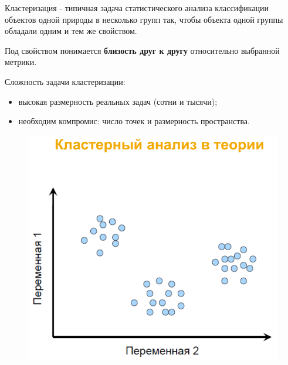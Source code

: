 \documentclass{beamer}
\begin{document}
\begin{frame}
	\begin{block}{Кластеризация - типичная задача статистического анализа}
		классификации объектов одной природы в несколько групп так, чтобы объекта одной группы обладали одним и тем же свойством.
	\end{block}
	Под свойством понимается \textbf{близость друг к другу} относительно выбранной метрики.
	
	\medskip Сложность задачи кластеризации:
	\begin{itemize}
		\item высокая размерность реальных задач (сотни и тысячи);
		\item необходим компромис: число точек и размерность пространства.
	\end{itemize}
	\begin{minipage}{0.4\textwidth}
		\begin{flushleft}
			\begin{figure}[h]
				\includegraphics[scale=0.2]{images/lec07-pic04.png}
			\end{figure}
		\end{flushleft}
	\end{minipage}
	\hfill
	\begin{minipage}{0.5\textwidth}
		\begin{flushright}
			\begin{figure}[h]

\end{figure}
\end{flushright}
\end{minipage}
\end{frame}
\end{document}
